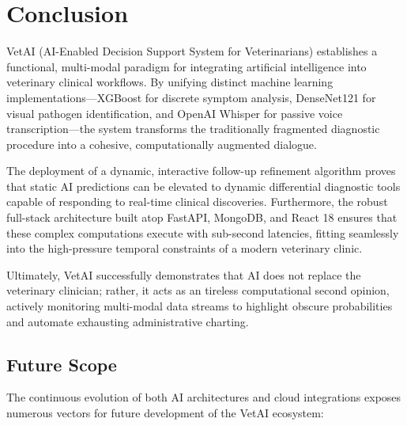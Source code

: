 \documentclass[a4paper,12pt]{report}
\begin{document}
\chapter{Conclusion}

VetAI (AI-Enabled Decision Support System for Veterinarians) establishes a functional, multi-modal paradigm for integrating artificial intelligence into veterinary clinical workflows. By unifying distinct machine learning implementations---XGBoost for discrete symptom analysis, DenseNet121 for visual pathogen identification, and OpenAI Whisper for passive voice transcription---the system transforms the traditionally fragmented diagnostic procedure into a cohesive, computationally augmented dialogue.

The deployment of a dynamic, interactive follow-up refinement algorithm proves that static AI predictions can be elevated to dynamic differential diagnostic tools capable of responding to real-time clinical discoveries. Furthermore, the robust full-stack architecture built atop FastAPI, MongoDB, and React 18 ensures that these complex computations execute with sub-second latencies, fitting seamlessly into the high-pressure temporal constraints of a modern veterinary clinic. 

Ultimately, VetAI successfully demonstrates that AI does not replace the veterinary clinician; rather, it acts as an tireless computational second opinion, actively monitoring multi-modal data streams to highlight obscure probabilities and automate exhausting administrative charting. 

\section{Future Scope}

The continuous evolution of both AI architectures and cloud integrations exposes numerous vectors for future development of the VetAI ecosystem:
\end{document}
